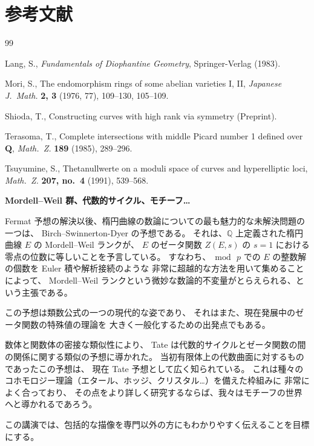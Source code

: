 \documentclass[uplatex,dvipdfmx]{jlreq}
\def\inbook#1{\textit{#1}}
\def\publ#1{#1}
\begin{document}
\section*{参考文献}

\begin{thebibliography}{99}

  Lang, S.,
  \inbook{Fundamentals of Diophantine Geometry},
  \publ{Springer-Verlag} (1983).

  Mori, S.,
  The endomorphism rings of some abelian varieties I, II,
  \textit{Japanese J.\ Math.}
  \textbf{2, 3} (1976, 77), 109--130, 105--109.

  Shioda, T.,
  Constructing curves with high rank via symmetry
  (Preprint).

  Terasoma, T.,
  Complete intersections with middle Picard number 1 defined over $\mathbf{Q}$,
  \textit{Math.\ Z.}
  \textbf{189} (1985), 289--296.

  Tsuyumine, S.,
  Thetanullwerte on a moduli space of curves and hyperelliptic loci,
  \textit{Math.\ Z.}
  \textbf{207, no.\ 4} (1991), 539--568.

\end{thebibliography}

\newpage


\begin{center}
{\large\bfseries Mordell--Weil 群、代数的サイクル、モチーフ{\ldots}}

\hspace*{\fill}{\large\bfseries 斎藤 毅（東大・数理）}
\end{center}

\bigskip

Fermat 予想の解決以後、楕円曲線の数論についての最も魅力的な未解決問題の一つは、
Birch--Swinnerton-Dyer の予想である。
それは、$\mathbb{Q}$ 上定義された楕円曲線 $E$ の Mordell--Weil ランクが、
$E$ のゼータ関数 $Z(E,s)$ の $s=1$ における零点の位数に等しいことを予言している。
すなわち、$\bmod\, p$ での $E$ の整数解の個数を Euler 積や解析接続のような
非常に超越的な方法を用いて集めることによって、
Mordell--Weil ランクという微妙な数論的不変量がとらえられる、という主張である。

\medskip

この予想は類数公式の一つの現代的な姿であり、
それはまた、現在発展中のゼータ関数の特殊値の理論を
大きく一般化するための出発点でもある。

\medskip

数体と関数体の密接な類似性により、
Tate は代数的サイクルとゼータ関数の間の関係に関する類似の予想に導かれた。
当初有限体上の代数曲面に対するものであったこの予想は、
現在 Tate 予想として広く知られている。
これは種々のコホモロジー理論（エタール、ホッジ、クリスタル{\ldots}）を備えた枠組みに
非常によく合っており、
その点をより詳しく研究するならば、我々はモチーフの世界へと導かれるであろう。

\medskip

この講演では、包括的な描像を専門以外の方にもわかりやすく伝えることを目標にする。
\end{document}
